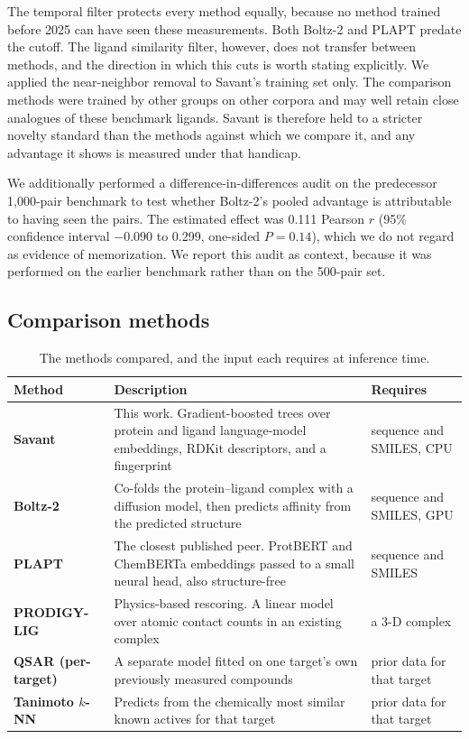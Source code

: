 \documentclass[11pt]{article}
\begin{document}
The temporal filter protects every method equally, because no method trained
before 2025 can have seen these measurements. Both Boltz-2 and PLAPT predate
the cutoff. The ligand similarity filter, however, does not transfer between
methods, and the direction in which this cuts is worth stating explicitly. We
applied the near-neighbor removal to Savant's training set only. The comparison
methods were trained by other groups on other corpora and may well retain close
analogues of these benchmark ligands. Savant is therefore held to a stricter
novelty standard than the methods against which we compare it, and any
advantage it shows is measured under that handicap.

We additionally performed a difference-in-differences audit on the predecessor
1,000-pair benchmark to test whether Boltz-2's pooled advantage is attributable
to having seen the pairs. The estimated effect was 0.111 Pearson $r$ (95\%
confidence interval $-0.090$ to 0.299, one-sided $P = 0.14$), which we do not
regard as evidence of memorization. We report this audit as context, because it
was performed on the earlier benchmark rather than on the 500-pair set.

\subsection{Comparison methods}

\begin{table}[H]
\centering
\caption{The methods compared, and the input each requires at inference time.}
\label{tab:tools}
\small
\begin{tabular}{p{}p{}p{}}
\toprule
Method & Description & Requires \\
\midrule
\textbf{Savant} & This work. Gradient-boosted trees over protein and ligand
language-model embeddings, RDKit descriptors, and a fingerprint &
sequence and SMILES, CPU \\
\textbf{Boltz-2} & Co-folds the protein--ligand complex with a diffusion
model, then predicts affinity from the predicted structure &
sequence and SMILES, GPU \\
\textbf{PLAPT} & The closest published peer. ProtBERT and ChemBERTa
embeddings passed to a small neural head, also structure-free &
sequence and SMILES \\
\textbf{PRODIGY-LIG} & Physics-based rescoring. A linear model over atomic
contact counts in an existing complex & a 3-D complex \\
\textbf{QSAR (per-target)} & A separate model fitted on one target's own
previously measured compounds & prior data for that target \\
\textbf{Tanimoto $k$-NN} & Predicts from the chemically most similar known
actives for that target & prior data for that target \\
\bottomrule
\end{tabular}
\end{table}
\end{document}
